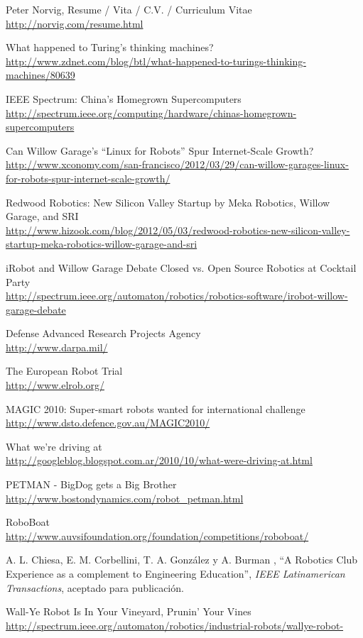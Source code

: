 \documentclass[a4paper,12pt]{article}
\begin{document}
\begin{thebibliography}{99}

Peter Norvig, Resume / Vita / C.V. / Curriculum Vitae \\
\url{http://norvig.com/resume.html}

What happened to Turing's thinking machines? \\
\url{http://www.zdnet.com/blog/btl/what-happened-to-turings-thinking-machines/80639}

IEEE Spectrum: China's Homegrown Supercomputers \\
\url{http://spectrum.ieee.org/computing/hardware/chinas-homegrown-supercomputers}

Can Willow Garage’s ``Linux for Robots'' Spur Internet-Scale Growth? \\
\url{http://www.xconomy.com/san-francisco/2012/03/29/can-willow-garages-linux-for-robots-spur-internet-scale-growth/}

Redwood Robotics: New Silicon Valley Startup by Meka Robotics, Willow Garage, and SRI \\
\url{http://www.hizook.com/blog/2012/05/03/redwood-robotics-new-silicon-valley-startup-meka-robotics-willow-garage-and-sri}

iRobot and Willow Garage Debate Closed vs. Open Source Robotics at Cocktail Party \\
\url{http://spectrum.ieee.org/automaton/robotics/robotics-software/irobot-willow-garage-debate}

Defense Advanced Research Projects Agency \\
\url{http://www.darpa.mil/}

The European Robot Trial \\
\url{http://www.elrob.org/}

MAGIC 2010: Super-smart robots wanted for international challenge \\
\url{http://www.dsto.defence.gov.au/MAGIC2010/}

What we're driving at \\
\url{http://googleblog.blogspot.com.ar/2010/10/what-were-driving-at.html}

PETMAN - BigDog gets a Big Brother \\
\url{http://www.bostondynamics.com/robot_petman.html}

RoboBoat \\
\url{http://www.auvsifoundation.org/foundation/competitions/roboboat/}

A. L. Chiesa, E. M. Corbellini, T. A. González y A. Burman , ``A Robotics Club Experience as a complement to Engineering Education'', \textit{IEEE Latinamerican Transactions}, aceptado para publicación.

Wall-Ye Robot Is In Your Vineyard, Prunin' Your Vines \\
\url{http://spectrum.ieee.org/automaton/robotics/industrial-robots/wallye-robot-}

\end{thebibliography}
\end{document}
